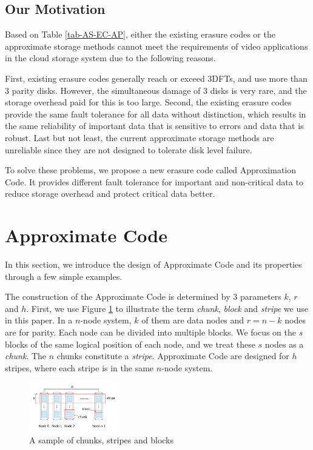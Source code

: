\documentclass[sigconf]{acmart}
\begin{document}
\subsection{Our Motivation}
Based on Table \ref{tab-AS-EC-AP}, either the existing erasure codes or the approximate storage methods cannot meet the requirements of video applications in the cloud storage system due to the following reasons. 

First, existing erasure codes generally reach or exceed 3DFTs, and use more than 3 parity disks. However, the simultaneous damage of 3 disks is very rare, and the storage overhead paid for this is too large. Second, the existing erasure codes provide the same fault tolerance for all data without distinction, which results in the same reliability of important data that is sensitive to errors and data that is robust. Last but not least, the current approximate storage methods are unreliable since they are not designed to tolerate disk level failure.

To solve these problems, we propose a new erasure code called Approximation Code. It provides different fault tolerance for important and non-critical data to reduce storage overhead and protect critical data better.

\section{Approximate Code}\label{ApCode}
In this section, we introduce the design of Approximate Code and its properties through a few simple examples. 

The construction of the Approximate Code is determined by 3 parameters $k$, $r$ and $h$. 
First, we use Figure \ref{fig-chunk-block} to illustrate the term \emph{chunk}, \emph{block} and \emph{stripe} we use in this paper. In a $n$-node system, $k$ of them are data nodes and $r=n-k$ nodes are for parity. Each node can be divided into multiple blocks. We focus on the $s$ blocks of the same logical position of each node, and we treat these $s$ nodes as a \emph{chunk}. The $n$ chunks constitute a \emph{stripe}. 
Approximate Code are designed for $h$ stripes, where each stripe is in the same $n$-node system.

\begin{figure}[ht]
\centering
\includegraphics[width=0.35\textwidth]{photo/chunk-block.pdf}
\caption{A sample of chunks, stripes and blocks}
\label{fig-chunk-block}
\end{figure}
\end{document}
